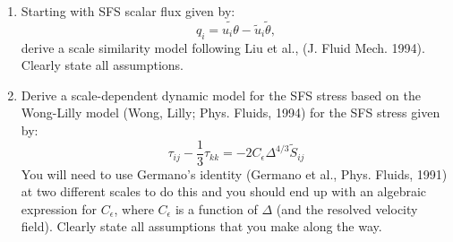 \documentclass[11pt]{article}
\begin{document}
\begin{enumerate}
\item Starting with SFS scalar flux given by:
\begin{displaymath}
q_i=\widetilde{u_i\theta}-\tilde{u}_i\tilde{\theta},
\end{displaymath}
derive a scale similarity model following Liu et al., (J. Fluid Mech. 1994).  Clearly state all assumptions.

\item Derive a scale-dependent dynamic model for the SFS stress based on the Wong-Lilly model (Wong, Lilly; Phys. Fluids, 1994) for the SFS
stress given by:
\begin{displaymath}
\tau_{ij}-\frac{1}{3}\tau_{kk}=-2C_{\epsilon}\Delta^{4/3}\tilde{S}_{ij}
\end{displaymath}
You will need to use Germano's identity (Germano et al., Phys. Fluids, 1991) at two different scales to do this and you should end up with an algebraic expression for $C_{\epsilon}$, where $C_{\epsilon}$ is a function of $\Delta$ (and the resolved velocity field).  Clearly state all assumptions that you make along the way.

\end{enumerate}
\end{document}
